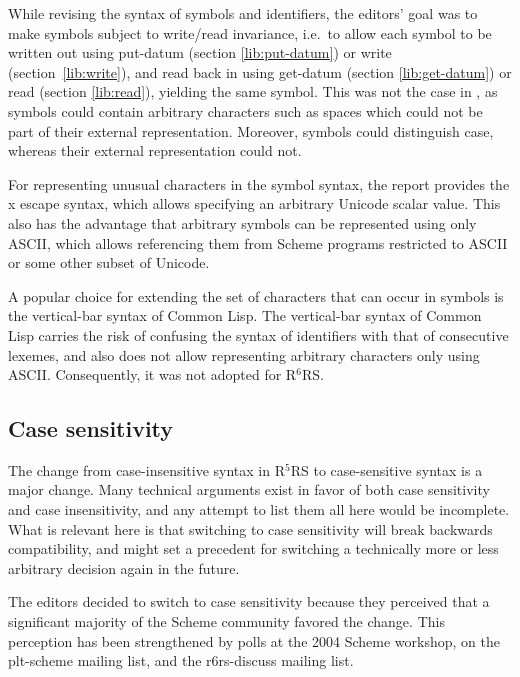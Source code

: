 \documentclass[twoside,twocolumn]{algol60}
\newcommand{\rn}[1]{R$^{#1}$RS}
\begin{document}
While revising the syntax of symbols and identifiers, the editors'
goal was to make symbols subject to write/read invariance, i.e.\ to
allow each symbol to be written out using {\cf put-datum} (section
\ref{lib:put-datum}) or {\cf write} (section~\ref{lib:write}), and
read back in using {\cf get-datum} (section \ref{lib:get-datum}) or
{\cf read} (section \ref{lib:read}), yielding the same symbol.  This
was not the case in , as symbols could contain arbitrary
characters such as spaces which could not be part of their external
representation.  Moreover, symbols could distinguish case, whereas
their external representation could not.

For representing unusual characters in the symbol syntax, the report
provides the {\cf\backwhack{}x} escape syntax, which allows specifying
an arbitrary Unicode scalar value.  This also has the advantage that
arbitrary symbols can be represented using only ASCII, which allows
referencing them from Scheme programs restricted to ASCII or some
other subset of Unicode.

A popular choice for extending the set of characters that can occur in
symbols is the vertical-bar syntax of Common Lisp.  The vertical-bar
syntax of Common Lisp carries the risk of confusing the syntax of
identifiers with that of consecutive lexemes, and also does not allow
representing arbitrary characters only using ASCII.  Consequently, it
was not adopted for \rn{6}.

\subsection{Case sensitivity}
\label{casesensitivityrationalesection}

The change from case-insensitive syntax in \rn{5} to case-sensitive
syntax is a major change.  Many technical arguments exist in favor of
both case sensitivity and case insensitivity, and any attempt to list
them all here would be incomplete.  What is relevant here is that
switching to case sensitivity will break backwards compatibility, and
might set a precedent for switching a technically more or less
arbitrary decision again in the future.

The editors decided to switch to case sensitivity because they
perceived that a significant majority of the Scheme community favored
the change.  This perception has been strengthened by polls at the
2004 Scheme workshop, on the {\cf plt-scheme} mailing list, and the
{\cf r6rs-discuss} mailing list.
\end{document}
